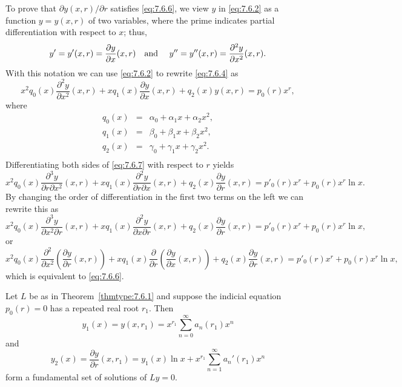 To prove that $\partial y(x,r)/\partial r$ satisfies \eqref{eq:7.6.6}, we view $y$ in
\eqref{eq:7.6.2} as a function $y=y(x,r)$ of two variables, where the prime indicates partial
differentiation with respect to $x$; thus,
\[
  y'=y'(x,r)=\frac{\partial y}{\partial x}(x,r)\mbox{\quad and \quad}y''=y''(x,r)=\frac{\partial^{2}y}{\partial x^{2}}(x,r).
\]
With this notation we can use \eqref{eq:7.6.2} to rewrite \eqref{eq:7.6.4} as
\begin{equation}
  \label{eq:7.6.7}x^{2}q_{0}(x)\frac{\partial^{2}y}{\partial x^{2}}(x,r)+xq_{1}(x)\frac{\partial y}{\partial x}(x,r)+q_{2}(x)y(x,r)=p_{0}(r)x^{r},
\end{equation}
where
\begin{eqnarray*}
  q_{0}(x) & = & \alpha_{0}+\alpha_{1}x+\alpha_{2}x^{2}, \\[5pt]
  q_{1}(x) & = & \beta_{0}+\beta_{1}x+\beta_{2}x^{2},    \\[5pt]
  q_{2}(x) & = & \gamma_{0}+\gamma_{1}x+\gamma_{2}x^{2}. \\[5pt]
\end{eqnarray*}
Differentiating both sides of \eqref{eq:7.6.7} with respect to $r$ yields
\[
  x^{2}q_{0}(x)\frac{\partial^{3}y}{\partial r\partial x^{2}}(x,r)+ xq_{1}(x)\frac{\partial^{2}y}{\partial r\partial x}(x,r)+q_{2}(x)\frac{\partial y}{\partial r}(x,r)=p'_{0}(r)x^{r}+p_{0}(r)x^{r}\ln x.
\]
By changing the order of differentiation in the first two terms on the left we can rewrite this as
\[
  x^{2}q_{0}(x)\frac{\partial^{3}y}{\partial x^{2}\partial r}(x,r) +xq_{1}(x)\frac{\partial^{2}y}{\partial x\partial r}(x,r)+q_{2}(x)\frac{\partial y}{\partial r}(x,r)=p'_{0}(r)x^{r}+p_{0}(r)x^{r}\ln x,
\]
or
\[
  x^{2}q_{0}(x)\frac{\partial^{2}}{\partial x^{2}}\left(\frac{\partial y}{\partial r}(x,r)\right) +xq_{1}(x)\frac{\partial}{\partial r}\left(\frac{\partial y}{\partial x}(x,r)\right)+q_{2}(x)\frac{\partial y}{\partial r}(x,r)= p'_{0}(r)x^{r}+p_{0}(r)x^{r}\ln x,
\]
which is equivalent to \eqref{eq:7.6.6}.

\begin{theorem}
  \color{blue}
  \label{thmtype:7.6.2} Let $L$ be as in Theorem~{\rm\ref{thmtype:7.6.1}} and suppose the indicial
  equation $p_{0}(r)=0$ has a repeated real root $r_{1}$. Then
  \[
    y_{1}(x)=y(x,r_{1})=x^{r_{1}}\sum_{n=0}^{\infty}a_{n}(r_{1})x^{n}
  \]
  and
  \begin{equation}
    \label{eq:7.6.8}y_{2}(x)=\frac{\partial y}{\partial r}(x,r_{1})=y_{1}(x)\ln x+x^{r_{1}}\sum_{n=1}^{\infty}a_{n}'(r_{1})x^{n}
  \end{equation}
  form a fundamental set of solutions of $Ly=0$.
\end{theorem}


